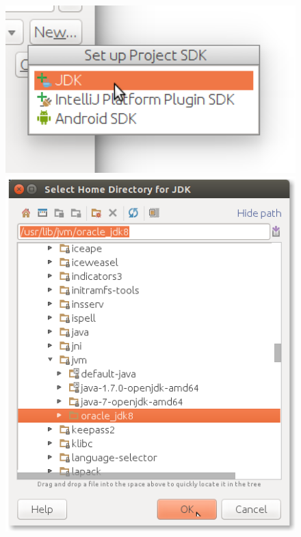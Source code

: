\begin{enumerate}
\begin{figure}[H]
\begin{minipage}{0.27\textwidth}
\includegraphics[width=1.0\textwidth]{../img/intellij/idea-project-sdk-jvm.png}
\end{minipage}
\begin{minipage}{0.35\textwidth}
\includegraphics[width=1.0\textwidth]{../img/intellij/idea-project-sdk-home.png}
\end{minipage}

\end{figure}
\end{enumerate}
